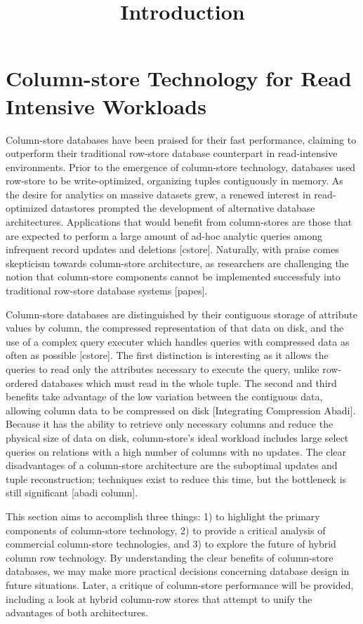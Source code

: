 \documentclass[11pt, onecolumn]{report}
\begin{document}
\chapter[Column-store Technology]{Column-store Technology for Read Intensive Workloads}

\title{Introduction}
Column-store databases have been praised for their fast performance, claiming to outperform their traditional row-store database counterpart in read-intensive environments. Prior to the emergence of column-store technology, databases used row-store to be write-optimized, organizing tuples contiguously in memory. As the desire for analytics on massive datasets grew, a renewed interest in read-optimized datastores prompted the development of alternative database architectures. Applications that would benefit from column-stores are those that are expected to perform a large amount of ad-hoc analytic queries among infrequent record updates and deletions [cstore]. Naturally, with praise comes skepticism towards column-store architecture, as researchers are challenging the notion that column-store components cannot be implemented successfuly into traditional row-store database systems [papes]. 

Column-store databases are distinguished by their contiguous storage of attribute values by column, the compressed representation of that data on disk, and the use of a complex query executer which handles queries with compressed data as often as possible [cstore]. The first distinction is interesting as it allows the queries to read only the attributes necessary to execute the query, unlike row-ordered databases which must read in the whole tuple. The second and third benefits take advantage of the low variation between the contiguous data, allowing column data to be compressed on disk [Integrating Compression Abadi]. Because it has the ability to retrieve only necessary columns and reduce the physical size of data on disk, column-store's ideal workload includes large select queries on relations with a high number of columns with no updates. The clear disadvantages of a column-store architecture are the suboptimal updates and tuple reconstruction; techniques exist to reduce this time, but the bottleneck is still significant [abadi column]. 

This section aims to accomplish three things: 1) to highlight the primary components of column-store technology, 2) to provide a critical analysis of commercial column-store technologies, and 3) to explore the future of hybrid column row technology. By understanding the clear benefits of column-store databases, we may make more practical decisions concerning database design in  future situations. Later, a critique of column-store performance will be provided, including a look at hybrid column-row stores that attempt to unify the advantages of both architectures. 
\end{document}
